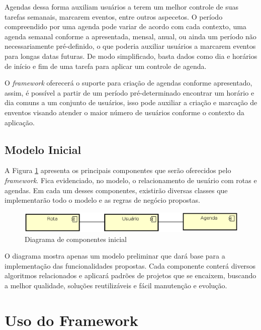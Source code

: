 Agendas dessa forma auxiliam usuários a terem um melhor controle de suas tarefas semanais, marcarem eventos, entre outros aspecetos. O período compreendido por uma agenda pode variar de acordo com cada contexto, uma agenda semanal conforme a apresentada, mensal, anual, ou ainda um período não necessariamente pré-definido, o que poderia auxiliar usuários a marcarem eventos para longas datas futuras. De modo simplificado, basta dados como dia e horários de início e fim de uma tarefa para aplicar um controle de agenda.

O \textit{framework} oferecerá o suporte para criação de agendas conforme apresentado, assim, é possível a partir de um período pré-determinado encontrar um horário e dia comuns a um conjunto de usuários, isso pode auxiliar a criação e marcação de enventos visando atender o maior número de usuários conforme o contexto da aplicação.

\subsection{Modelo Inicial}

A Figura \ref{diagrama de componentes} apresenta os principais componentes que serão oferecidos pelo \textit{framework}. Fica evidenciado, no modelo, o relacionamento de usuário com rotas e agendas. Em cada um desses componentes, existirão diversas classes que implementarão todo o modelo e as regras de negócio propostas.

\begin{figure}[!h]
	\centering
	\includegraphics[scale=0.55]{figuras/capitulo5/diagrama_componentes.eps}
	\caption{Diagrama de componentes inicial}
	\label{diagrama de componentes}
\end{figure}

O diagrama mostra apenas um modelo preliminar que dará base para a implementação das funcionalidades propostas. Cada componente conterá diversos algoritmos relacionados e aplicará padrões de projetos que se encaixem, buscando a melhor qualidade, soluções reutilizáveis e fácil manutenção e evolução.

\section{Uso do Framework}

